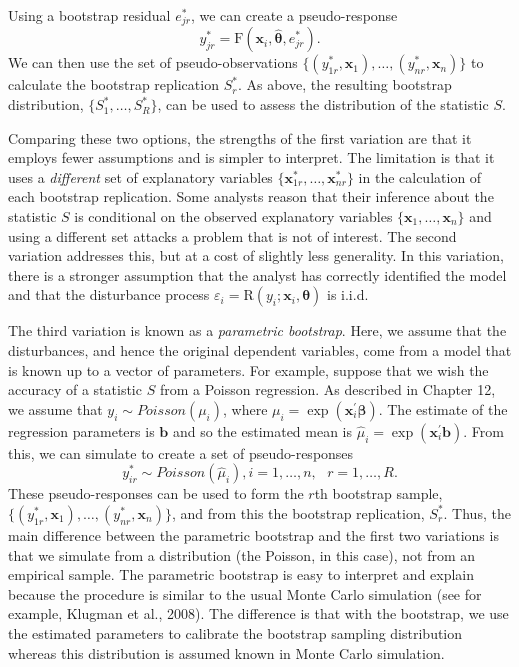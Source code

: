 Using a bootstrap residual $e^{\ast}_{jr}$, we can create a
pseudo-response
\begin{equation*}
y^{\ast}_{jr}= \mathrm{F}(\mathbf{x}_i, \widehat{\boldsymbol
\theta}, e^{\ast}_{jr}).
\end{equation*}
We can then use the set of pseudo-observations
$\{(y^{\ast}_{1r},\mathbf{x}_1), \ldots,
(y^{\ast}_{nr},\mathbf{x}_n)\}$ to calculate the bootstrap
replication $S^{\ast}_r$. As above, the resulting bootstrap
distribution, $\{S^{\ast}_1, \ldots, S^{\ast}_R\}$, can be used to
assess the distribution of the statistic $S$.

Comparing these two options, the strengths of the first variation
are that it employs fewer assumptions and is simpler to interpret.
The limitation is that it uses a \emph{different} set of explanatory
variables $\{ \mathbf{x}^{\ast}_{1r}, \ldots, \mathbf{x}^{\ast}_{nr}
\}$ in the calculation of each bootstrap replication. Some analysts
reason that their inference about the statistic $S$ is conditional
on the observed explanatory variables $\{ \mathbf{x}_1, \ldots,
\mathbf{x}_n \}$ and using a different set attacks a problem that is
not of interest. The second variation addresses this, but at a cost
of slightly less generality. In this variation, there is a stronger
assumption that the analyst has correctly identified the model and
that the disturbance process $\varepsilon_i = \mathrm{R}(y_i;
\mathbf{x}_i,\boldsymbol \theta)$ is i.i.d.

The third variation is known as a \textit{parametric bootstrap}.
Here, we assume that the disturbances, and hence the original
dependent variables, come from a model that is known up to a vector
of parameters. For example, suppose that we wish the accuracy of a
statistic $S$ from a Poisson regression. As described in Chapter 12,
we assume that $y_i \sim Poisson (\mu_i)$, where $\mu_i =
\exp(\mathbf{x}_i^{\prime} \boldsymbol \beta )$. The estimate of the
regression parameters is $\mathbf{b}$ and so the estimated mean is
$\widehat{\mu}_i = \exp(\mathbf{x}_i^{\prime} \mathbf{b} )$. From
this, we can simulate to create a set of pseudo-responses
\begin{equation*}
y^{\ast}_{ir}\sim Poisson (\widehat{\mu}_i), i=1,\ldots, n,
~~~r=1,\ldots, R.
\end{equation*}
These pseudo-responses can be used to form the $r$th bootstrap
sample, \newline $\{(y^{\ast}_{1r},\mathbf{x}_1), \ldots,
(y^{\ast}_{nr},\mathbf{x}_n)\}$, and from this the bootstrap
replication, $S^{\ast}_r$. Thus, the main difference between the
parametric bootstrap and the first two variations is that we
simulate from a distribution (the Poisson, in this case), not from
an empirical sample. The parametric bootstrap is easy to interpret
and explain because the procedure is similar to the usual Monte
Carlo simulation (see for example, Klugman et al., 2008). The
difference is that with the bootstrap, we use the estimated
parameters to calibrate the bootstrap sampling distribution whereas
this distribution is assumed known in Monte Carlo simulation.


